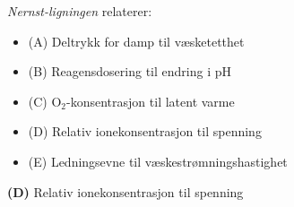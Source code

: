 

{\it Nernst-ligningen} relaterer:

\begin{itemize}
\item{(A)} Deltrykk for damp til væsketetthet
\vskip 5pt 
\item{(B)} Reagensdosering til endring i pH
\vskip 5pt 
\item{(C)} O$_{2}$-konsentrasjon til latent varme
\vskip 5pt 
\item{(D)} Relativ ionekonsentrasjon til spenning
\vskip 5pt 
\item{(E)} Ledningsevne til væskestrømningshastighet
\end{itemize}







{\bf (D)} Relativ ionekonsentrasjon til spenning 
 







